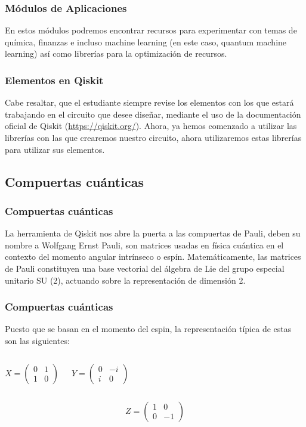 \documentclass[spanish]{beamer}
\begin{document}
\newpage\justify\setlength{\parskip}{5mm}
\begin{frame}\frametitle{Módulos de Aplicaciones} 
En estos módulos podremos encontrar recursos para experimentar con temas de química, finanzas e incluso machine learning (en este caso, quantum machine learning) así como librerías para la optimización de recursos.
\end{frame} 

\newpage\justify\setlength{\parskip}{5mm}
\begin{frame}\frametitle{Elementos en Qiskit}    
Cabe resaltar, que el estudiante siempre revise los elementos con los que estará trabajando en el circuito que desee diseñar, mediante el uso de la documentación oficial de Qiskit (\url{https://qiskit.org/}). Ahora, ya hemos comenzado a utilizar las librerías con las que crearemos nuestro circuito, ahora utilizaremos estas librerías para utilizar sus elementos.
 \end{frame}
 
\newpage\subsection{Compuertas cuánticas}\justify
\begin{frame}
\frametitle{Compuertas cuánticas}
La herramienta de Qiskit nos abre la puerta a las compuertas de Pauli, deben su nombre a Wolfgang Ernst Pauli, son matrices usadas en física cuántica en el contexto del momento angular intrínseco o espín. Matemáticamente, las matrices de Pauli constituyen una base vectorial del álgebra de Lie del grupo especial unitario SU (2), actuando sobre la representación de dimensión 2.
\end{frame}

\newpage\justify
\begin{frame}
\frametitle{Compuertas cuánticas}
Puesto que se basan en el momento del espin, la representación típica de estas son las siguientes:

\begin{columns}
\begin{equation}
X=\begin{pmatrix}
        0 & 1\\
        1 & 0
        \end{pmatrix}
    \end{equation}
    
\begin{equation}
Y=\begin{pmatrix}
        0 & -i\\
        i & 0
        \end{pmatrix}
    \end{equation}
\end{columns}

\begin{equation}
Z=\begin{pmatrix}
        1 & 0\\
        0 & -1
        \end{pmatrix}
    \end{equation}
\end{frame}
\end{document}
